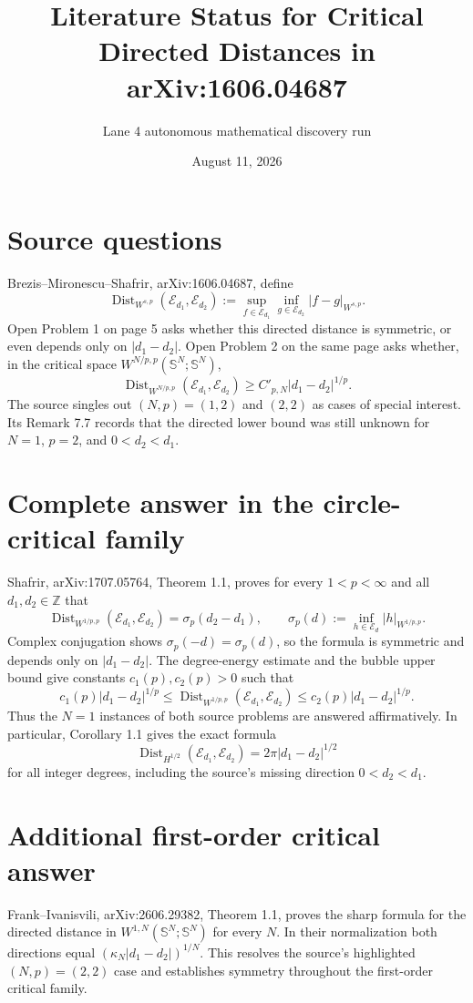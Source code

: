 \documentclass[11pt]{article}
\title{Literature Status for Critical Directed Distances in arXiv:1606.04687}
\author{Lane 4 autonomous mathematical discovery run}
\date{August 11, 2026}
\newcommand{\Dist}{\operatorname{Dist}}
\newcommand{\E}{\mathcal E}
\begin{document}
\maketitle

\section*{Source questions}
Brezis--Mironescu--Shafrir, arXiv:1606.04687, define
\[
 \Dist_{W^{s,p}}(\E_{d_1},\E_{d_2})
 :=\sup_{f\in\E_{d_1}}\inf_{g\in\E_{d_2}}|f-g|_{W^{s,p}}.
\]
Open Problem 1 on page 5 asks whether this directed distance is symmetric,
or even depends only on $|d_1-d_2|$. Open Problem 2 on the same page asks
whether, in the critical space $W^{N/p,p}(\mathbb S^N;\mathbb S^N)$,
\[
 \Dist_{W^{N/p,p}}(\E_{d_1},\E_{d_2})
 \ge C'_{p,N}|d_1-d_2|^{1/p}.
\]
The source singles out $(N,p)=(1,2)$ and $(2,2)$ as cases of special
interest. Its Remark 7.7 records that the directed lower bound was still
unknown for $N=1$, $p=2$, and $0<d_2<d_1$.

\section*{Complete answer in the circle-critical family}
Shafrir, arXiv:1707.05764, Theorem 1.1, proves for every $1<p<\infty$ and
all $d_1,d_2\in\mathbb Z$ that
\[
 \Dist_{W^{1/p,p}}(\E_{d_1},\E_{d_2})=\sigma_p(d_2-d_1),
 \qquad
 \sigma_p(d):=\inf_{h\in\E_d}|h|_{W^{1/p,p}}.
\]
Complex conjugation shows $\sigma_p(-d)=\sigma_p(d)$, so the formula is
symmetric and depends only on $|d_1-d_2|$. The degree-energy estimate and
the bubble upper bound give constants $c_1(p),c_2(p)>0$ such that
\[
 c_1(p)|d_1-d_2|^{1/p}
 \le \Dist_{W^{1/p,p}}(\E_{d_1},\E_{d_2})
 \le c_2(p)|d_1-d_2|^{1/p}.
\]
Thus the $N=1$ instances of both source problems are answered affirmatively.
In particular, Corollary 1.1 gives the exact formula
\[
 \Dist_{H^{1/2}}(\E_{d_1},\E_{d_2})
 =2\pi |d_1-d_2|^{1/2}
\]
for all integer degrees, including the source's missing direction
$0<d_2<d_1$.

\section*{Additional first-order critical answer}
Frank--Ivanisvili, arXiv:2606.29382, Theorem 1.1, proves the sharp formula
for the directed distance in $W^{1,N}(\mathbb S^N;\mathbb S^N)$ for every
$N$. In their normalization both directions equal
$(\kappa_N|d_1-d_2|)^{1/N}$. This resolves the source's highlighted
$(N,p)=(2,2)$ case and establishes symmetry throughout the first-order
critical family.
\end{document}
